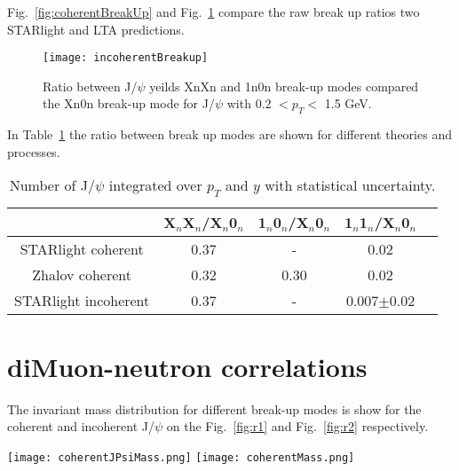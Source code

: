     Fig.~\ref{fig:coherentBreakUp} and Fig.~\ref{fig:incoherentBreakUp} compare
      the raw break up ratios two STARlight and LTA predictions. 

    \begin{figure}[!Hhtb]
      \centering
      \texttt{[image: incoherentBreakup]}
      \caption{Ratio between J/$\psi$ yeilds XnXn and 1n0n break-up modes 
        compared the Xn0n break-up mode for J/$\psi$ with 0.2 $< p_{T} <$ 
        1.5 GeV.}
      \label{fig:incoherentBreakUp}
    \end{figure}

    In Table~\ref{tab:r3} the ratio between break up modes are shown for 
      different theories and processes.

    \begin{table}[h]
      \begin{center}
        \caption{Number of  J/$\psi$ integrated over $p_{T}$ and $y$ with statistical uncertainty.}
        \label{tab:r3}
        \begin{tabular}{|c|c|c|c|c|}
          \hline
          & X$_{n}$X$_{n}$/X$_{n}$0$_{n}$ & 1$_{n}$0$_{n}$/X$_{n}$0$_{n}$ & 1$_{n}$1$_{n}$/X$_{n}$0$_{n}$  \\ 
          \hline
          STARlight coherent &  0.37&-&0.02\\
          \hline
          Zhalov coherent& 0.32&0.30&0.02\\
          \hline
          STARlight incoherent &  0.37&-&0.007$\pm$0.02 \\
          \hline
        \end{tabular}
      \end{center}
    \end{table}
  \section{diMuon-neutron correlations}
    The invariant mass distribution for different break-up modes is show for the coherent and incoherent J/$\psi$ on the Fig.~\ref{fig:r1} and Fig.~\ref{fig:r2} respectively. 
    \begin{figure*}[!Hhtb]
      \begin{center}
        \texttt{[image: coherentJPsiMass.png]}
        \texttt{[image: coherentMass.png]}
        \caption{
          \label{fig:r1}  
          Invariant mass spectrum of the opposite signs di-muons originating from the coherent J/$\psi$ for $X_{n}0_{n}$ breakup mode for two invariant mass regions.  
        }
      \end{center}
    \end{figure*}
    
